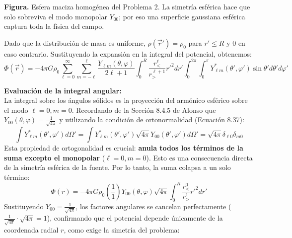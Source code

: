 \documentclass[a4paper]{article}
\begin{document}
\begin{center}

\par\smallskip
{\small\textbf{Figura.} Esfera maciza homogénea del Problema 2. La simetría esférica hace que solo sobreviva el modo monopolar $Y_{00}$; por eso una superficie gaussiana esférica captura toda la física del campo.}
\end{center}

Dado que la distribución de masa es uniforme, $\rho(\vec{r}') = \rho_0$ para $r' \leq R$ y $0$ en caso contrario. Sustituyendo la expansión en la integral del potencial, obtenemos:
$$
\Phi(\vec{r}) = -4\pi G \rho_0 \sum_{\ell=0}^{\infty} \sum_{m=-\ell}^{\ell} \frac{Y_{\ell m}(\theta, \varphi)}{2\ell+1} \int_0^R \frac{r_{<}^\ell}{r_{>}^{\ell+1}} r'^2 dr' \int_{0}^{2\pi} \int_{0}^{\pi} Y_{\ell m}^*(\theta', \varphi') \sin\theta' d\theta' d\varphi'
$$

\textbf{Evaluación de la integral angular:} \\
La integral sobre los ángulos sólidos es la proyección del armónico esférico sobre el modo $\ell=0, m=0$. Recordando de la Sección 8.4.5 de Alonso que $Y_{00}(\theta, \varphi) = \frac{1}{\sqrt{4\pi}}$ y utilizando la condición de ortonormalidad (Ecuación 8.37):
$$
\int Y_{\ell m}^*(\theta', \varphi') d\Omega' = \int Y_{\ell m}^*(\theta', \varphi') \sqrt{4\pi} Y_{00}(\theta', \varphi') d\Omega' = \sqrt{4\pi} \delta_{\ell 0} \delta_{m 0}
$$
Esta propiedad de ortogonalidad es crucial: \textbf{anula todos los términos de la suma excepto el monopolar} ($\ell=0, m=0$). Esto es una consecuencia directa de la simetría esférica de la fuente. Por lo tanto, la suma colapsa a un solo término:
$$
\Phi(r) = -4\pi G \rho_0 \left( \frac{1}{1} \right) Y_{00}(\theta, \varphi) \sqrt{4\pi} \int_0^R \frac{r_{<}^0}{r_{>}^1} r'^2 dr'
$$
Sustituyendo $Y_{00} = \frac{1}{\sqrt{4\pi}}$, los factores angulares se cancelan perfectamente ($\frac{1}{\sqrt{4\pi}} \cdot \sqrt{4\pi} = 1$), confirmando que el potencial depende únicamente de la coordenada radial $r$, como exige la simetría del problema:
\end{document}
